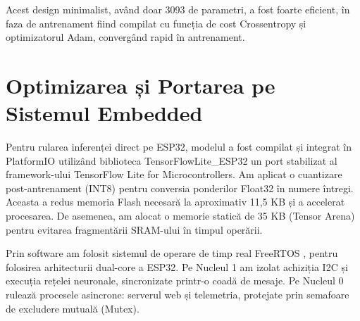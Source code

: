 	
	Acest design minimalist, având doar 3093 de parametri, a fost foarte eficient, în faza de antrenament fiind compilat cu funcția de cost Crossentropy și optimizatorul Adam, convergând rapid în antrenament.
	
	
\section{Optimizarea și Portarea pe Sistemul Embedded}
	
	Pentru rularea inferenței direct pe ESP32, modelul a fost compilat și integrat în PlatformIO utilizând biblioteca TensorFlowLite\_ESP32 \cite{tanaka2026tflite_esp32} un port stabilizat al framework-ului TensorFlow Lite for Microcontrollers. \cite{tensorflow:tflitemicro_github} Am aplicat o cuantizare post-antrenament (INT8) pentru conversia ponderilor Float32 în numere întregi. Aceasta a redus memoria Flash necesară la aproximativ 11,5 KB și a accelerat procesarea. De asemenea, am alocat o memorie statică de 35 KB (Tensor Arena) pentru evitarea fragmentării SRAM-ului în timpul operării. \cite{esp32_datasheet}
	
	
	Prin software am folosit sistemul de operare de timp real FreeRTOS \cite{aws:freertos}, pentru folosirea arhitecturii dual-core a ESP32. Pe Nucleul 1 am izolat achiziția I2C și execuția rețelei neuronale, sincronizate printr-o coadă de mesaje. Pe Nucleul 0 rulează procesele asincrone: serverul web și telemetria, protejate prin semafoare de excludere mutuală (Mutex).  \cite{esp32_datasheet,mathieucarbou:asynctcp, mathieucarbou:espasyncwebserver}

	